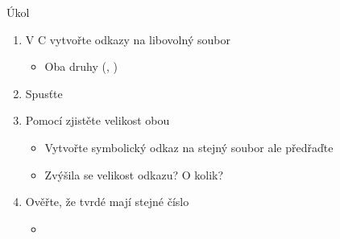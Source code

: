 \begin{frame}{Úkol}

  \begin{enumerate}
    \item V C vytvořte odkazy na libovolný soubor
    \begin{itemize}
      \item Oba druhy (, )
    \end{itemize}

    \item Spusťte
    \item Pomocí  zjistěte velikost obou
    \begin{itemize}
      \item Vytvořte symbolický odkaz na stejný soubor ale předřaďte 
      \item Zvýšila se velikost odkazu? O kolik?
    \end{itemize}
    \item Ověřte, že tvrdé mají stejné číslo 
    \begin{itemize}
      \item {}
    \end{itemize}
  \end{enumerate}

\end{frame}

